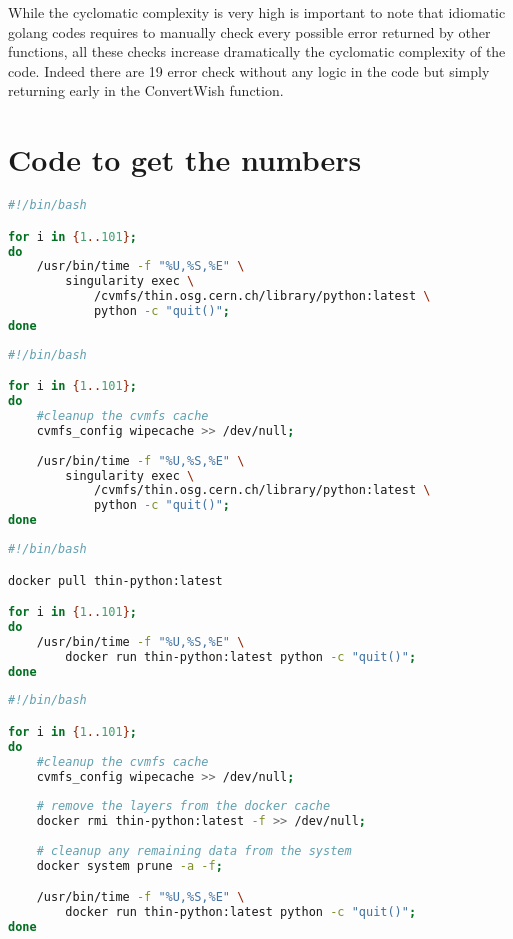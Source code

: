 While the cyclomatic complexity is very high is important to note that
idiomatic golang codes requires to manually check every possible error returned
by other functions, all these checks increase dramatically the cyclomatic
complexity of the code. Indeed there are 19 error check without any logic in
the code but simply returning early in the ConvertWish function.


\section{Code to get the numbers}


\begin{lstlisting}[language=bash,
    caption={Script used to capture the startup time of singularity with image hostes in CVMFS using CVMFS cache}]
#!/bin/bash

for i in {1..101}; 
do 
    /usr/bin/time -f "%U,%S,%E" \
        singularity exec \
            /cvmfs/thin.osg.cern.ch/library/python:latest \
            python -c "quit()"; 
done
\end{lstlisting}


\begin{lstlisting}[language=bash,
    caption={Script used to capture the startup time of singularity with image hostes in CVMFS without cache}]
#!/bin/bash

for i in {1..101}; 
do 
    #cleanup the cvmfs cache
    cvmfs_config wipecache >> /dev/null; 
    
    /usr/bin/time -f "%U,%S,%E" \
        singularity exec \
            /cvmfs/thin.osg.cern.ch/library/python:latest \
            python -c "quit()"; 
done
\end{lstlisting}


\begin{lstlisting}[language=bash,
    caption={Script used to capture the startup time of docker thin-images using both CVMFS and Docker cache}]
#!/bin/bash

docker pull thin-python:latest

for i in {1..101}; 
do 
    /usr/bin/time -f "%U,%S,%E" \
        docker run thin-python:latest python -c "quit()"; 
done
\end{lstlisting}



\begin{lstlisting}[language=bash,
    caption={Script used to capture the startup time of docker thin-images without Docker nor CVMFS cache}]
#!/bin/bash

for i in {1..101}; 
do 
    #cleanup the cvmfs cache
    cvmfs_config wipecache >> /dev/null; 
    
    # remove the layers from the docker cache
    docker rmi thin-python:latest -f >> /dev/null; 
    
    # cleanup any remaining data from the system
    docker system prune -a -f; 

    /usr/bin/time -f "%U,%S,%E" \
        docker run thin-python:latest python -c "quit()"; 
done
\end{lstlisting}




